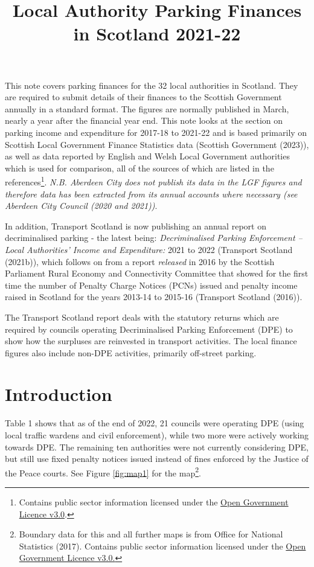 \documentclass[
  12pt,
]{article}
\title{Local Authority Parking Finances in Scotland 2021-22}
\author{}
\date{\vspace{-2.5em}}
\begin{document}
\maketitle

\renewcommand{\arraystretch}{1.2}

This note covers parking finances for the 32 local authorities in Scotland. They are required to submit details of their finances to the Scottish Government annually in a standard format. The figures are normally published in March, nearly a year after the financial year end. This note looks at the section on parking income and expenditure for 2017-18 to 2021-22 and is based primarily on Scottish Local Government Finance Statistics data (Scottish Government (2023)), as well as data reported by English and Welsh Local Government authorities which is used for comparison, all of the sources of which are listed in the references\footnote{Contains public sector information licensed under the \href{http://www.nationalarchives.gov.uk/doc/open-government-licence/version/3/}{Open Government Licence v3.0}.}. \emph{N.B. Aberdeen City does not publish its data in the LGF figures and therefore data has been extracted from its annual accounts where necessary (see Aberdeen City Council (2020 and 2021))}.

In addition, Transport Scotland is now publishing an annual report on decriminalised parking - the latest being: \emph{Decriminalised Parking Enforcement -- Local Authorities' Income and Expenditure:} 2021 to 2022 (Transport Scotland (2021b)), which follows on from a report \emph{released} in 2016 by the Scottish Parliament Rural Economy and Connectivity Committee that showed for the first time the number of Penalty Charge Notices (PCNs) issued and penalty income raised in Scotland for the years 2013-14 to 2015-16 (Transport Scotland (2016)).

The Transport Scotland report deals with the statutory returns which are required by councils operating Decriminalised Parking Enforcement (DPE) to show how the surpluses are reinvested in transport activities. The local finance figures also include non-DPE activities, primarily off-street parking.

\hypertarget{introduction}{%
\section{Introduction}\label{introduction}}

Table 1 shows that as of the end of 2022, 21 councils were operating DPE (using local traffic wardens and civil enforcement), while two more were actively working towards DPE. The remaining ten authorities were not currently considering DPE, but still use fixed penalty notices issued instead of fines enforced by the Justice of the Peace courts. See Figure \ref{fig:map1} for the map\footnote{Boundary data for this and all further maps is from Office for National Statistics (2017). Contains public sector information licensed under the \href{http://www.nationalarchives.gov.uk/doc/open-government-licence/version/3/}{Open Government Licence v3.0.}}.
\end{document}
